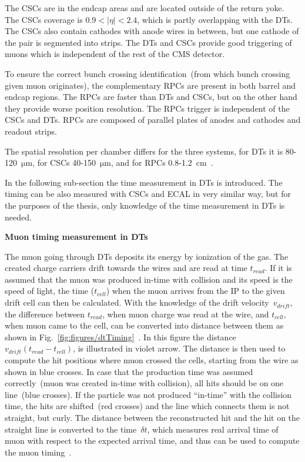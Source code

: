 The CSCs are in the endcap areas and are located outside of the return yoke. The CSCs coverage is $0.9<|\eta|<2.4$, which is partly overlapping with the DTs. The CSCs also contain cathodes with anode wires in between, but one cathode of the pair is segmented into strips. The DTs and CSCs provide good triggering of muons which is independent of the rest of the CMS detector.

To ensure the correct bunch crossing identification~(from which bunch crossing given muon originates), the complementary RPCs are present in both barrel and endcap regions. The RPCs are faster than DTs and CSCs, but on the other hand they provide worse position resolution. The RPCs trigger is independent of the CSCs and DTs. RPCs are composed of parallel plates of anodes and cathodes and readout strips. 

The spatial resolution per chamber differs for the three systems, for DTs it is 80-120~$\mathrm{\mu m}$, for CSCs 40-150~$\mathrm{\mu m}$, and for RPCs 0.8-1.2~$\mathrm{cm}$~\cite{Chatrchyan:2013sba}.

In the following sub-section the time measurement in DTs is introduced. The timing can be also measured with CSCs and ECAL in very similar way, but for the purposes of the thesis, only knowledge of the time measurement in DTs is needed.


\textbf{Muon timing measurement in DTs~\label{sec:muonTiming}}

The muon going through DTs deposits its energy by ionization of the gas. The created charge carriers drift towards the wires and are read at time $t_{read}$. If it is assumed that the muon was produced in-time with collision and its speed is the speed of light, the time ($t_{cell}$) when the muon arrives from the IP to the given drift cell can then be calculated. With the knowledge of the drift velocity~$v_{drift}$, the difference between $t_{read}$, when muon charge was read at the wire, and $t_{cell}$, when muon came to the cell, can be converted into distance between them as shown in Fig.~\ref{fig:figures/dtTiming}~\cite{Traczyk:1365029}. In this figure the distance $ v_{drift} (t_{read} - t_{cell})$, is illustrated in violet arrow. The distance is then used to compute the hit positions where muon crossed the cells, starting from the wire as shown in blue crosses. In case that the production time was assumed correctly~(muon was created in-time with collision), all hits should be on one line~(blue crosses). If the particle was not produced ``in-time'' with the collision time, the hits are shifted~(red crosses) and the line which connects them is not straight, but curly. The distance between the reconstructed hit and the hit on the straight line is converted to the time~$\delta t$, which measures real arrival time of muon with respect to the expected arrival time, and thus can be used to compute the muon timing~\cite{Traczyk:1365029}.


